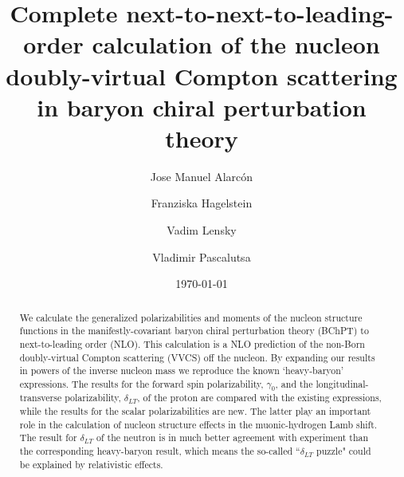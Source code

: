 \documentclass[twocolumn,prc,showpacs,nofootinbib,preprintnumbers,amsmath,amssymb,superscriptaddress]{revtex4-1}
\begin{document}
\title {Complete next-to-next-to-leading-order calculation of
the nucleon doubly-virtual Compton scattering  in baryon chiral perturbation theory}
\author{Jose Manuel Alarc\'on}
\author{Franziska Hagelstein}
\author{Vadim Lensky}
\author{Vladimir Pascalutsa}

\begin{abstract}
We calculate the generalized polarizabilities and moments of the nucleon structure functions in the manifestly-covariant  baryon chiral perturbation theory (BChPT) to next-to-leading order (NLO). 
This calculation is a NLO prediction of the non-Born doubly-virtual Compton scattering (VVCS) off the nucleon.
By expanding our results in powers of the inverse nucleon  mass
we reproduce the known `heavy-baryon' expressions.  The results for the
forward spin polarizability, $\gamma_0$, and the longitudinal-transverse polarizability, $\delta_{LT}$,
of the proton are compared with the existing expressions, while the results
for the scalar polarizabilities are new. The latter play an
important role in the calculation of nucleon structure 
effects in the muonic-hydrogen Lamb shift. 
The result for $\delta_{LT}$ of the neutron
is in much better agreement with experiment than 
the corresponding heavy-baryon result, which means
the so-called ``$\delta_{LT}$ puzzle" could be explained
by relativistic effects.
\end{abstract}
\date{\today}
\maketitle
\end{document}

